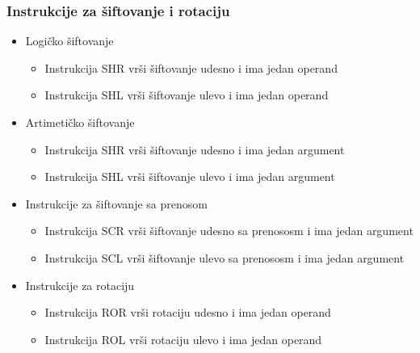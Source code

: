 \documentclass[hyperref={pdfpagelabels=false}]{beamer}
\begin{document}
	\begin{frame}
		\frametitle{Instrukcije za \v siftovanje i rotaciju}
		\begin{itemize}
			\item \pause Logi\v cko \v siftovanje \pause
				\begin{itemize}
					\item Instrukcija SHR vr\v si \v siftovanje udesno i ima jedan operand\pause
					\item Instrukcija SHL vr\v si \v siftovanje ulevo i ima jedan operand\pause
				\end{itemize}
			\item Artimeti\v cko \v siftovanje
				\begin{itemize}
					\item Instrukcija SHR vr\v si \v siftovanje udesno i ima jedan argument \pause
					\item Instrukcija SHL vr\v si \v siftovanje ulevo i ima jedan argument \pause
				\end{itemize}
			\item Instrukcije za \v siftovanje sa prenosom
			\begin{itemize}
					\item Instrukcija SCR vr\v si \v siftovanje udesno sa prenososm i ima jedan argument\pause
					\item Instrukcija SCL vr\v si \v siftovanje ulevo sa prenososm i ima jedan argument\pause
				\end{itemize}
			\item Instrukcije za rotaciju
			\begin{itemize}
					\item Instrukcija ROR vr\v si rotaciju udesno i ima jedan operand\pause
					\item Instrukcija ROL vr\v si rotaciju ulevo i ima jedan operand 
				\end{itemize}
			
		\end{itemize}
	\end{frame}
\end{document}

